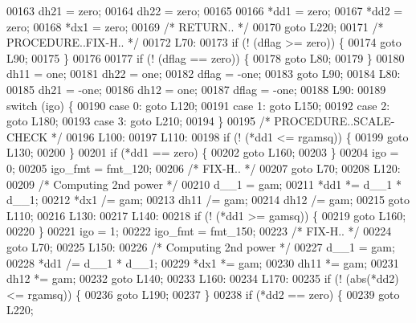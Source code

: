 \begin{DoxyCode}
00163     dh21 = zero;
00164     dh22 = zero;
00165 
00166     *dd1 = zero;
00167     *dd2 = zero;
00168     *dx1 = zero;
00169 \textcolor{comment}{/*         RETURN.. */}
00170     \textcolor{keywordflow}{goto} L220;
00171 \textcolor{comment}{/*     PROCEDURE..FIX-H.. */}
00172 L70:
00173     \textcolor{keywordflow}{if} (! (dflag >= zero)) \{
00174     \textcolor{keywordflow}{goto} L90;
00175     \}
00176 
00177     \textcolor{keywordflow}{if} (! (dflag == zero)) \{
00178     \textcolor{keywordflow}{goto} L80;
00179     \}
00180     dh11 = one;
00181     dh22 = one;
00182     dflag = -one;
00183     \textcolor{keywordflow}{goto} L90;
00184 L80:
00185     dh21 = -one;
00186     dh12 = one;
00187     dflag = -one;
00188 L90:
00189     \textcolor{keywordflow}{switch} (igo) \{
00190     \textcolor{keywordflow}{case} 0: \textcolor{keywordflow}{goto} L120;
00191     \textcolor{keywordflow}{case} 1: \textcolor{keywordflow}{goto} L150;
00192     \textcolor{keywordflow}{case} 2: \textcolor{keywordflow}{goto} L180;
00193     \textcolor{keywordflow}{case} 3: \textcolor{keywordflow}{goto} L210;
00194     \}
00195 \textcolor{comment}{/*     PROCEDURE..SCALE-CHECK */}
00196 L100:
00197 L110:
00198     \textcolor{keywordflow}{if} (! (*dd1 <= rgamsq)) \{
00199     \textcolor{keywordflow}{goto} L130;
00200     \}
00201     \textcolor{keywordflow}{if} (*dd1 == zero) \{
00202     \textcolor{keywordflow}{goto} L160;
00203     \}
00204     igo = 0;
00205     igo\_fmt = fmt\_120;
00206 \textcolor{comment}{/*              FIX-H.. */}
00207     \textcolor{keywordflow}{goto} L70;
00208 L120:
00209 \textcolor{comment}{/* Computing 2nd power */}
00210     d\_\_1 = gam;
00211     *dd1 *= d\_\_1 * d\_\_1;
00212     *dx1 /= gam;
00213     dh11 /= gam;
00214     dh12 /= gam;
00215     \textcolor{keywordflow}{goto} L110;
00216 L130:
00217 L140:
00218     \textcolor{keywordflow}{if} (! (*dd1 >= gamsq)) \{
00219     \textcolor{keywordflow}{goto} L160;
00220     \}
00221     igo = 1;
00222     igo\_fmt = fmt\_150;
00223 \textcolor{comment}{/*              FIX-H.. */}
00224     \textcolor{keywordflow}{goto} L70;
00225 L150:
00226 \textcolor{comment}{/* Computing 2nd power */}
00227     d\_\_1 = gam;
00228     *dd1 /= d\_\_1 * d\_\_1;
00229     *dx1 *= gam;
00230     dh11 *= gam;
00231     dh12 *= gam;
00232     \textcolor{keywordflow}{goto} L140;
00233 L160:
00234 L170:
00235     \textcolor{keywordflow}{if} (! (abs(*dd2) <= rgamsq)) \{
00236     \textcolor{keywordflow}{goto} L190;
00237     \}
00238     \textcolor{keywordflow}{if} (*dd2 == zero) \{
00239     \textcolor{keywordflow}{goto} L220;

\end{DoxyCode}
